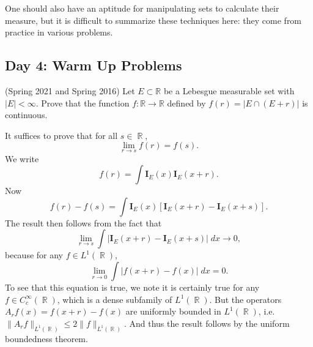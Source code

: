 \documentclass{exam}
\DeclareMathOperator{\RR}{\mathbb{R}}
\theoremstyle{problemstyle}
\newcommand{\1}[1]{\textbf{1}_{\left[#1\right]}} %
\def\R{\mathbb{R}} %
\begin{document}
%
One should also have an aptitude for manipulating sets to calculate their measure, but it is difficult to summarize these techniques here: they come from practice in various problems.

\begin{questions}    

\newpage
\section*{Day 4: Warm Up Problems}

\question  (Spring 2021 and Spring 2016)
  Let $E\subset \R$ be a Lebesgue measurable set with $|E|<\infty$. Prove that the function $f:\R\to \R$ defined by $f(r)= |E\cap (E+r)|$ is continuous.
\begin{solution}
    It suffices to prove that for all $s \in \RR$,
    \[ \lim_{r \to s} f(r) = f(s). \]
    We write
    \[ f(r) = \int \mathbf{I}_E(x) \mathbf{I}_E(x + r). \]
    Now
    \[ f(r) - f(s) = \int \mathbf{I}_E(x) [\mathbf{I}_E(x + r) - \mathbf{I}_E(x + s)]. \]
    The result then follows from the fact that
    \[ \lim_{r \to s} \int | \mathbf{I}_E(x + r) - \mathbf{I}_E(x + s)|\; dx \to 0, \]
    because for any $f \in L^1(\RR)$,
    \[ \lim_{r \to 0} \int |f(x + r) - f(x)|\; dx = 0. \]
    To see that this equation is true, we note it is certainly true for any $f \in C_c^\infty(\RR)$, which is a dense subfamily of $L^1(\RR)$. But the operators $A_r f(x) = f(x + r) - f(x)$ are uniformly bounded in $L^1(\RR)$, i.e. $\| A_r f \|_{L^1(\RR)} \leq 2 \| f \|_{L^1(\RR)}$. And thus the result follows by the uniform boundedness theorem.

    \begin{comment}
    As $r \to s$, the integrand tends to zero pointwise. And moreover, the integrands are uniformly dominated by $2\mathbf{I}_E$, which is an integrable function. Thus the dominated convergence theorem implies that
    \[ \lim_{r \to s} f(r) - f(s) = 0. \]
    Thus $f$ is a continuous function.


\end{comment}
\end{solution}
\end{questions}
\end{document}
